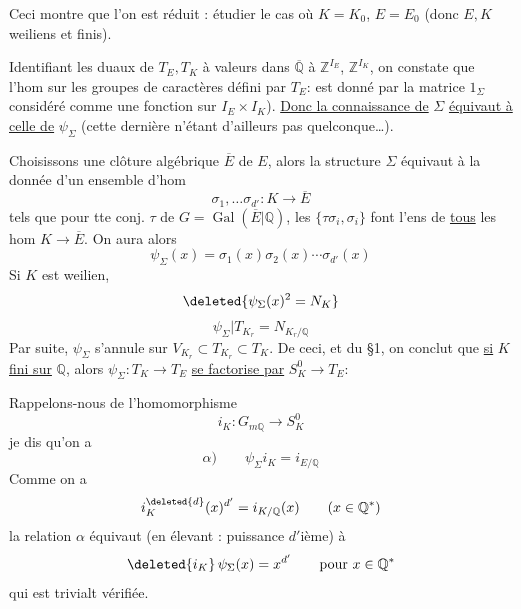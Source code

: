 Ceci montre que l'on est réduit : étudier  le cas où
$K=K_0$, $E=E_0$ (donc $E,K$ weiliens et finis).

Identifiant les duaux de $T_E,T_K$ à valeurs dans $\overline{\mathbb Q}$ à
$\mathbb Z^{I_E}$, $\mathbb Z^{I_K}$, on constate que l'hom
 sur les  groupes de caractères
défini par $T_E$:
est donné par la matrice $1_\Sigma$ considéré comme une fonction
 sur $I_E\times I_K$).
\uline{Donc la connaissance de} $\Sigma$ \uline{équivaut à celle de} $\psi_\Sigma$
(cette dernière n'étant d'ailleurs pas quelconque\ldots).

Choisissons une clôture algébrique $\overline E$ de $E$,
 
alors la structure $\Sigma$ équivaut à la donnée d'un ensemble  d'hom
\[
\sigma_1,\ldots\sigma_{d'}:K\longrightarrow\overline E
\]
 tels que pour tte conj. $\tau$ de $G=\operatorname{Gal}(\overline E|\mathbb Q)$,
les $\{\tau\sigma_i,\sigma_i\}$ font l'ens de \uline{tous} les hom $K\longrightarrow\overline E$.
On aura alors
\[
\psi_\Sigma(x)=\sigma_1(x)\sigma_2(x)\cdots\sigma_{d'}(x)
\]
Si $K$ est weilien,
\[
\deleted{\psi_\Sigma(x)^2=N_K}
\]
\[
\psi_\Sigma|T_{K_r}=N_{K_r/\mathbb Q}
\]
Par suite, $\psi_\Sigma$ s'annule sur $V_{K_r}\subset T_{K_r}\subset T_K$.
De ceci, et du §1, on conclut que \uline{si} $K$ \uline{fini sur} $\mathbb Q$,
alors $\psi_\Sigma:T_K\longrightarrow T_E$ \uline{se factorise par} $S_K^0\longrightarrow T_E$:

Rappelons-nous de l'homomorphisme
\[
i_K:G_{m\mathbb Q}\longrightarrow S_K^0
\]
je dis qu'on a
\[
\alpha)\qquad\boxed{\psi_\Sigma i_K=i_{E/\mathbb Q}}
\]
Comme on a
\[
i_K^{\deleted{d}}(x)^{d'}=i_{K/\mathbb Q}(x)\qquad(x\in\mathbb Q^*)
\]
la relation $\alpha$ équivaut (en élevant : puissance $d'$ième) à
\[
\deleted{i_K}\,\psi_\Sigma(x)=x^{d'}\qquad\text{pour }x\in\mathbb Q^*
\]
qui est trivialt vérifiée.

